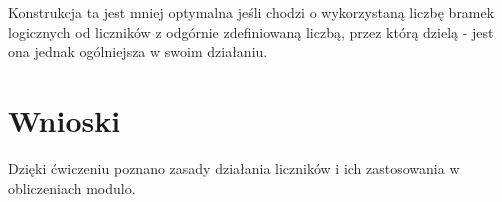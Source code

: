 \documentclass[12pt,a4paper]{article}
\begin{document}
Konstrukcja ta jest mniej optymalna jeśli chodzi o wykorzystaną liczbę bramek logicznych od liczników z odgórnie zdefiniowaną liczbą, przez którą dzielą - jest ona jednak ogólniejsza w swoim działaniu.

\section{Wnioski}
Dzięki ćwiczeniu poznano zasady działania liczników i ich zastosowania w obliczeniach modulo. 
\end{document}
